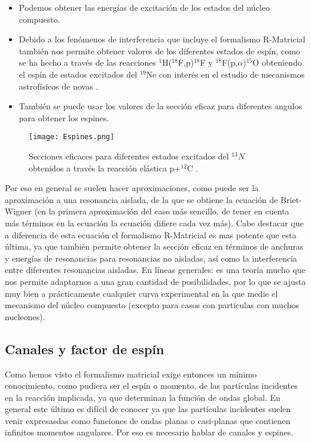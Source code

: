 \documentclass[fleqn,11pt]{SelfArx} %
\begin{document}
\begin{itemize}
\item Podemos obtener las energías de excitación de los estados del núcleo compuesto.
\item Debido a los fenómenos de interferencia que incluye el formalismo R-Matricial también nos permite obtener valores de los diferentes estados de espín, como se ha hecho a través de las reacciones $^{1}$H($^{18}$F,p)$^{18}$F y $^{18}$F(p,$\alpha$)$^{15}$O obteniendo el espín de estados excitados del $^{19}$Ne con interés en el estudio de mecanismos astrofísicos de novas \cite{18Fp}.
\item También se puede usar los valores de la sección eficaz para diferentes angulos para obtener los espines.
\end{itemize}

\begin{figure}[h!] \centering
	\texttt{[image: Espines.png]}
	\caption{Secciones eficaces para diferentes estados excitados del $^{13}N$ obtenidos a través la reacción elástica p+$^{12}$C \cite{Ressonant-Scattering-Elastic}.}
	\label{Fig:06}
\end{figure}

Por eso en general se suelen hacer aproximaciones, como puede ser la aproximación a una resonancia aislada, de la que se obtiene la ecuación de Briet-Wigner (en la primera aproximación del caso más sencillo, de tener en cuenta más términos en la ecuación la ecuación difiere cada vez más). Cabe destacar que a diferencia de esta ecuación el formalismo R-Matricial es mas potente que esta última, ya que también permite obtener la sección eficaz en términos de anchuras y energías de resonancias para resonancias no aisladas, así como la interferencia entre diferentes resonancias aisladas. En líneas generales: es una teoría mucho que nos permite adaptarnos a una gran cantidad de posibilidades, por lo que se ajusta muy bien a prácticamente cualquier curva experimental en la que medie el mecanismo del núcleo compuesto (excepto para casos con partículas con muchos nucleones).

\subsection{Canales y factor de espín}

Como hemos visto el formalismo matricial exige entonces un mínimo conocimiento, como pudiera ser el espín o momento, de las partículas incidentes en la reacción implicada, ya que determinan la función de ondas global. En general este último es difícil de conocer ya que las partículas incidentes suelen venir expresasdas como funciones de ondas planas o casi-planas que contienen infinitos momentos angulares. Por eso es necesario hablar de canales y espines.
\end{document}
